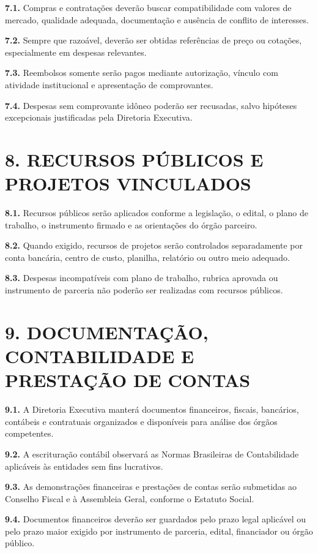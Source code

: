 \documentclass[11pt,a4paper]{article}
\begin{document}
\textbf{7.1.} Compras e contratações deverão buscar compatibilidade com valores de mercado, qualidade adequada, documentação e ausência de conflito de interesses.

\textbf{7.2.} Sempre que razoável, deverão ser obtidas referências de preço ou cotações, especialmente em despesas relevantes.

\textbf{7.3.} Reembolsos somente serão pagos mediante autorização, vínculo com atividade institucional e apresentação de comprovantes.

\textbf{7.4.} Despesas sem comprovante idôneo poderão ser recusadas, salvo hipóteses excepcionais justificadas pela Diretoria Executiva.

\section*{8. RECURSOS PÚBLICOS E PROJETOS VINCULADOS}

\textbf{8.1.} Recursos públicos serão aplicados conforme a legislação, o edital, o plano de trabalho, o instrumento firmado e as orientações do órgão parceiro.

\textbf{8.2.} Quando exigido, recursos de projetos serão controlados separadamente por conta bancária, centro de custo, planilha, relatório ou outro meio adequado.

\textbf{8.3.} Despesas incompatíveis com plano de trabalho, rubrica aprovada ou instrumento de parceria não poderão ser realizadas com recursos públicos.

\section*{9. DOCUMENTAÇÃO, CONTABILIDADE E PRESTAÇÃO DE CONTAS}

\textbf{9.1.} A Diretoria Executiva manterá documentos financeiros, fiscais, bancários, contábeis e contratuais organizados e disponíveis para análise dos órgãos competentes.

\textbf{9.2.} A escrituração contábil observará as Normas Brasileiras de Contabilidade aplicáveis às entidades sem fins lucrativos.

\textbf{9.3.} As demonstrações financeiras e prestações de contas serão submetidas ao Conselho Fiscal e à Assembleia Geral, conforme o Estatuto Social.

\textbf{9.4.} Documentos financeiros deverão ser guardados pelo prazo legal aplicável ou pelo prazo maior exigido por instrumento de parceria, edital, financiador ou órgão público.
\end{document}
